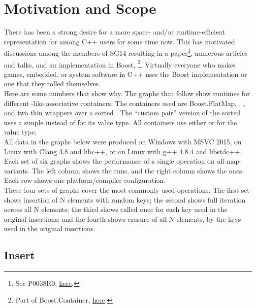 \section{Motivation and Scope}

There has been a strong desire for a more space- and/or runtime-efficient
representation for  among C++ users for some time now.  This has
motivated discussions among the members of SG14 resulting in a
paper\footnote{See P0038R0,
  \href{http://www.open-std.org/jtc1/sc22/wg21/docs/papers/2015/p0038r0.html}{here}.},
numerous articles and talks, and an implementation in Boost,
\footnote{Part of Boost.Container,
  \href{http://www.boost.org/doc/libs/1_61_0/doc/html/container.html}{here}.}.
Virtually everyone who makes games, embedded, or system software in C++ uses
the Boost implementation or one that they rolled themselves.\\

Here are some numbers that show why.  The graphs that follow show runtimes for
different -like associative containers.  The containers used are
Boost.FlatMap, , , and two thin wrappers over a
sorted .  The ``custom pair'' version of the sorted 
uses a simple  instead of  for its value type.  All
containers use either  or 
for the value type.\\

All data in the graphs below were produced on Windows with MSVC 2015, on Linux
with Clang 3.8 and libc++, or on Linux with g++ 4.8.4 and libstdc++.\\

Each set of six graphs shows the performance of a single operation on all
map-variants.  The left column shows the  runs, and the right
column shows the  ones.  Each row shows one
platform/compiler configuration. \\

These four sets of graphs cover the most commonly-used operations.  The first
set shows insertion of N elements with random keys; the second shows full
iteration across all N elements; the third shows  called once
for each key used in the original insertions; and the fourth shows erasure of
all N elements, by the keys used in the original insertions.\\

\subsection{Insert}

